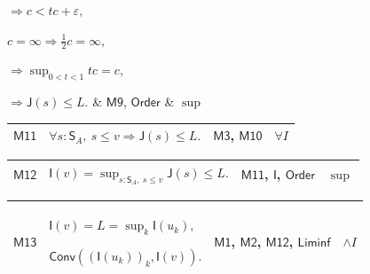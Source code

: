 \documentclass[11pt]{amsart}
\newlength{\FTCFourColumnBody}
\begin{document}
{\begin{tabular}
$\displaystyle \Rightarrow c<tc+\varepsilon,$\par
$\displaystyle c=\infty\Rightarrow\tfrac12c=\infty,$\par
$\displaystyle \Rightarrow\sup_{0<t<1}tc=c,$\par
$\displaystyle \Rightarrow\textsf{J}(s)\le L.$ & \hyperlink{proof:M9}{$\displaystyle \textsf{M9}$}, \hyperlink{ax:Order}{$\displaystyle \textsf{Order}$} & $\displaystyle \sup$\\ \hline
\end{tabular}%
\par\setlength{\parskip}{0pt}\nointerlineskip
\noindent
\begin{tabular}{|@{}>{\centering\arraybackslash}m{0.078431\FTCFourColumnBody}|>{\centering\arraybackslash}m{0.535947\FTCFourColumnBody}|>{\centering\arraybackslash}m{0.281045\FTCFourColumnBody}|>{\centering\arraybackslash}m{0.104575\FTCFourColumnBody}|}\hline
\hypertarget{proof:M11}{$\displaystyle \textsf{M11}$} & $\displaystyle \forall s:\textsf{S}_A,\ s\le v\Rightarrow\textsf{J}(s)\le L.$ & \hyperlink{proof:M3}{$\displaystyle \textsf{M3}$}, \hyperlink{proof:M10}{$\displaystyle \textsf{M10}$} & $\displaystyle \forall I$\\ \hline
\end{tabular}%
\par\setlength{\parskip}{0pt}\nointerlineskip
\noindent
\begin{tabular}{|@{}>{\centering\arraybackslash}m{0.078431\FTCFourColumnBody}|>{\centering\arraybackslash}m{0.535947\FTCFourColumnBody}|>{\centering\arraybackslash}m{0.281045\FTCFourColumnBody}|>{\centering\arraybackslash}m{0.104575\FTCFourColumnBody}|}\hline
\hypertarget{proof:M12}{$\displaystyle \textsf{M12}$} & $\displaystyle \textsf{I}(v)=\sup_{s:\textsf{S}_A,\ s\le v}\textsf{J}(s)\le L.$ & \hyperlink{proof:M11}{$\displaystyle \textsf{M11}$}, \hyperlink{def:I}{$\displaystyle \textsf{I}$}, \hyperlink{ax:Order}{$\displaystyle \textsf{Order}$} & $\displaystyle \sup$\\ \hline
\end{tabular}%
\par\setlength{\parskip}{0pt}\nointerlineskip
\noindent
\begin{tabular}{|@{}>{\centering\arraybackslash}m{0.078431\FTCFourColumnBody}|>{\centering\arraybackslash}m{0.535947\FTCFourColumnBody}|>{\centering\arraybackslash}m{0.281045\FTCFourColumnBody}|>{\centering\arraybackslash}m{0.104575\FTCFourColumnBody}|}\hline
\hypertarget{proof:M13}{$\displaystyle \textsf{M13}$} & $\displaystyle \textsf{I}(v)=L=\sup_k\textsf{I}(u_k),$\par
$\displaystyle \textsf{Conv}((\textsf{I}(u_k))_k,\textsf{I}(v)).$ & \hyperlink{proof:M1}{$\displaystyle \textsf{M1}$}, \hyperlink{proof:M2}{$\displaystyle \textsf{M2}$}, \hyperlink{proof:M12}{$\displaystyle \textsf{M12}$}, \hyperlink{lem:Liminf}{$\displaystyle \textsf{Liminf}$} & $\displaystyle \land I$\\ \hline
\end{tabular}%
\par
}
\end{document}
